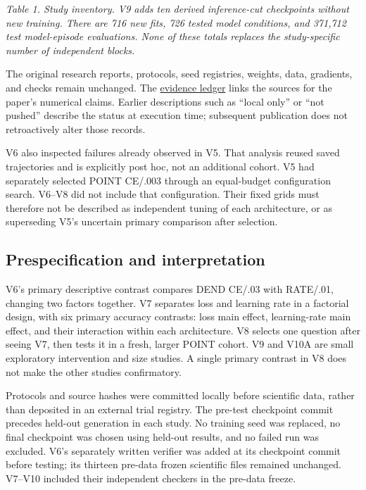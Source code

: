 \documentclass[
  10pt,
]{article}
\begin{document}
\emph{Table 1. Study inventory. V9 adds ten derived inference-cut
checkpoints without new training. There are 716 new fits, 726 tested
model conditions, and 371,712 test model-episode evaluations. None of
these totals replaces the study-specific number of independent blocks.}

The original research reports, protocols, seed registries, weights,
data, gradients, and checks remain unchanged. The
\href{EVIDENCE.md}{evidence ledger} links the sources for the paper's
numerical claims. Earlier descriptions such as ``local only'' or ``not
pushed'' describe the status at execution time; subsequent publication
does not retroactively alter those records.

V6 also inspected failures already observed in V5. That analysis reused
saved trajectories and is explicitly post hoc, not an additional cohort.
V5 had separately selected POINT CE/.003 through an equal-budget
configuration search. V6--V8 did not include that configuration. Their
fixed grids must therefore not be described as independent tuning of
each architecture, or as superseding V5's uncertain primary comparison
after selection.

\subsection{Prespecification and
interpretation}\label{prespecification-and-interpretation}

V6's primary descriptive contrast compares DEND CE/.03 with RATE/.01,
changing two factors together. V7 separates loss and learning rate in a
factorial design, with six primary accuracy contrasts: loss main effect,
learning-rate main effect, and their interaction within each
architecture. V8 selects one question after seeing V7, then tests it in
a fresh, larger POINT cohort. V9 and V10A are small exploratory
intervention and size studies. A single primary contrast in V8 does not
make the other studies confirmatory.

Protocols and source hashes were committed locally before scientific
data, rather than deposited in an external trial registry. The pre-test
checkpoint commit precedes held-out generation in each study. No
training seed was replaced, no final checkpoint was chosen using
held-out results, and no failed run was excluded. V6's separately
written verifier was added at its checkpoint commit before testing; its
thirteen pre-data frozen scientific files remained unchanged. V7--V10
included their independent checkers in the pre-data freeze.
\end{document}
